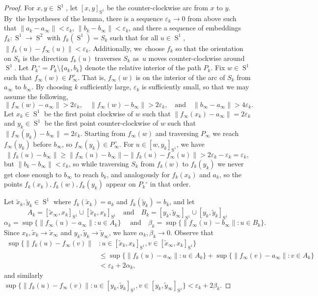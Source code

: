 \documentclass[JEP,XML,SOM,Unicode,NoFloatCountersInSection,published]{cedram}
\theoremstyle{remark}
\let\eps\varepsilon
\DeclareMathOperator{\sphere}{S}
\begin{document}
\begin{proof}
For $x,y \in \sphere^1$, let $[x,y]_{\sphere^1}$ be the counter-clockwise arc from $x$ to $y$.
By~the hypotheses of the lemma, there is a sequence $\eps_k \to 0$ from above such that \hbox{$\|a_k - a_\infty\| < \eps_k$}, $\|b_k - b_\infty\| < \eps_k$,
and there a sequence of embeddings $f_k : \sphere^1 \to \sphere^2$ with $f_k(\sphere^1) = S_k$
such that for all $u \in \sphere^1$, $\|f_k(u) - f_\infty(u)\| < \eps_k $.
Additionally, we~choose $f_k$ so that the orientation on $S_k$ is the direction $f_k(u)$ traverses $S_k$ as~$u$ moves counter-clockwise around $\sphere^1$.
Let $P_k{}^\circ = P_k\setminus\{a_k,b_k\}$ denote the relative interior of the path $P_k$.
Fix $w \in \sphere^1$ such that ${f_\infty(w) \in P_\infty^{\,\circ}}$.
That is, $f_\infty(w)$ is on the interior of the arc of $S_k$ from $a_\infty$ to $b_\infty$.
By choosing $k$ sufficiently large, $\eps_{k}$ is sufficiently small, so that we may assume the following,
\[
\|f_\infty(w) -a_\infty\| > 2\eps_{k}, \quad
\|f_\infty(w) -b_\infty\| > 2\eps_{k}, \quad \text{and} \quad
\|b_\infty - a_\infty\| > 4\eps_k.
\]
Let $x_k \in \sphere^1$ be the first point clockwise of $w$ such that
$\|f_\infty(x_k) - a_\infty\| = 2\eps_k$
and $y_k \in \sphere^1$ be the first point counter-clockwise of $w$ such that
$\|f_\infty(y_k) - b_\infty\| = 2\eps_k$.
Starting from $f_\infty(w)$ and traversing $P_\infty$ we reach $f_\infty(y_k)$ before $b_\infty$, so
$f_\infty(y_k) \in P_\infty^{\,\circ}$.
For $u \in [w,y_k]_{\sphere^1}$, we have
\[ \|f_k(u) - b_\infty\| \geq \| f_\infty(u) - b_\infty \| - \|f_k(u) -f_\infty(u)\| > 2\eps_k -\eps_k = \eps_k, \]
but $\|b_k - b_\infty\| < \eps_k$, so while traversing $S_k$ from $f_k(w)$ to $f_k(y_k)$ we never get close enough to $b_\infty$ to reach $b_k$,
and analogously for $f_k(x_k)$ and $a_k$,
so the points $f_k(x_k),f_k(w),f_k(y_k)$ appear on $P_k{}^\circ$ in that order.

Let $\tilde x_k, \tilde y_k \in \sphere^1$ where $f_k (\tilde x_k) = a_k$ and $f_k (\tilde y_k) = b_k$, and
let
\[ A_k = [\tilde x_\infty,x_k]_{\sphere^1} \cup [\tilde x_k,x_k]_{\sphere^1} \quad \text{and}\quad
B_k = [y_k, \tilde y_\infty]_{\sphere^1} \cup [y_k, \tilde y_k]_{\sphere^1}
\]
\[ \alpha_k = \sup \{ \|f_\infty(u)-a_\infty\| :u \in A_k \} \quad \text{ and} \quad
\beta_k = \sup \{ \|f_\infty(u)-b_\infty\| :u \in B_k \}.
\]
Since $x_k,\tilde x_k \to \tilde x_\infty$ and $y_k, \tilde y_k \to \tilde y_\infty$, we have $\alpha_k,\beta_k \to 0$. Observe that
\begin{align*}
\sup \{ \|f_k(u)-f_\infty(v)\| &:u \in [\tilde x_k,x_k]_{\sphere^1},v \in [\tilde x_\infty,x_k]_{\sphere^1} \} \\
& \leq \sup \{ \|f_k(u) -a_\infty \| : u \in A_k \} + \sup \{ \|f_\infty(v) -a_\infty \| : v \in A_k \} \\
& < \eps_k +2\alpha_k,
\end{align*}
and similarly
$\sup \{ \|f_k(u)-f_\infty(v)\| :u \in [y_k,\tilde y_k]_{\sphere^1},v \in [y_k,\tilde y_\infty]_{\sphere^1} \} < \eps_k +2\beta_k $.


\end{proof}
\end{document}
